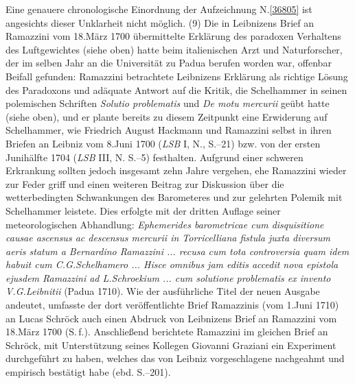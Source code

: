 Eine genauere chronologische Einordnung der Aufzeichnung N.\;\ref{36805} ist angesichts dieser Unklarheit nicht möglich.
\pend%
\pstart%
(9)
Die in Leibnizens Brief an Ramazzini vom 18.\;März 1700 übermittelte Erklärung des paradoxen Verhaltens des Luftgewichtes\cite{01454} (siehe oben) hatte beim italienischen Arzt und Naturforscher, der im selben Jahr an die Universität zu Padua berufen worden war, offenbar Beifall gefunden:
Ramazzini betrachtete Leibnizens Erklärung als richtige Lösung des Paradoxons und adäquate Antwort auf die Kritik, die Schelhammer in seinen polemischen Schriften \textit{Solutio problematis}\cite{01450} und \textit{De motu mercurii}\cite{01452} geübt hatte (siehe oben),
und er plante bereits zu diesem Zeitpunkt eine Erwiderung auf Schelhammer, wie Friedrich August Hackmann und Ramazzini selbst in ihren Briefen an Leibniz vom 8.\;Juni 1700 (\textit{LSB} I, N., S.--21)\cite{01464} bzw. von der ersten Junihälfte 1704 (\textit{LSB} III, N. S.--5)\cite{01466} festhalten.
Aufgrund einer schweren Erkrankung sollten jedoch insgesamt zehn Jahre vergehen, ehe Ramazzini wieder zur Feder griff und einen weiteren Beitrag zur Diskussion über die wetterbedingten Schwankungen des Barometeres und zur gelehrten Polemik mit Schelhammer leistete.
Dies erfolgte mit der dritten Auflage seiner meteorologischen Abhandlung:
\textit{Ephemerides barometricae cum disquisitione causae ascensus ac descensus mercurii in Torricelliana fistula juxta diversum aeris statum a Bernardino Ramazzini ... recusa cum tota controversia quam idem habuit cum C.\:G.\;Schelhamero ... Hisce omnibus jam editis accedit nova epistola ejusdem Ramazzini ad L.\;Schroekium ... cum solutione problematis ex invento V.\:G.\;Leibnitii} (Padua 1710).\cite{01462}
Wie der ausführliche Titel der neuen Ausgabe andeutet, umfasste der dort veröffentlichte Brief Ramazzinis (vom 1.\;Juni 1710) an Lucas Schröck auch einen Abdruck von Leibnizens Brief an Ramazzini vom 18.\;März 1700 (S.\,f.).\cite{01460}\cite{01454}
Anschließend berichtete Ramazzini im gleichen Brief an Schröck, mit Unterstützung seines Kollegen Giovanni Graziani ein Experiment durchgeführt zu haben, welches das von Leibniz vorgeschlagene nachgeahmt und empirisch bestätigt habe (ebd. S.--201).\cite{01462}\cite{01460}
